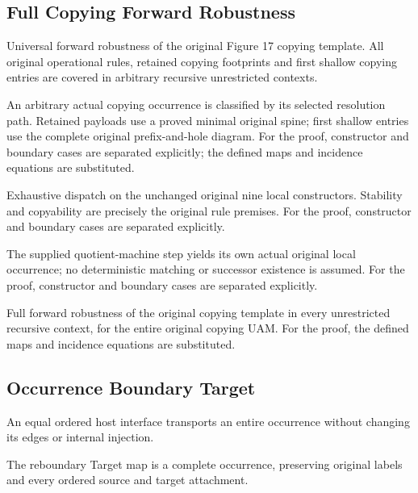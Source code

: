 \subsection{Full Copying Forward Robustness}
Universal forward robustness of the original Figure 17 copying template. All original operational rules, retained copying footprints and first shallow copying entries are covered in arbitrary recursive unrestricted contexts.

An arbitrary actual copying occurrence is classified by its selected resolution path. Retained payloads use a proved minimal original spine; first shallow entries use the complete original prefix-and-hole diagram.
For the proof, constructor and boundary cases are separated explicitly; the defined maps and incidence equations are substituted.
\par{}

Exhaustive dispatch on the unchanged original nine local constructors. Stability and copyability are precisely the original rule premises.
For the proof, constructor and boundary cases are separated explicitly.
\par{}

The supplied quotient-machine step yields its own actual original local occurrence; no deterministic matching or successor existence is assumed.
For the proof, constructor and boundary cases are separated explicitly.
\par{}

Full forward robustness of the original copying template in every unrestricted recursive context, for the entire original copying UAM.
For the proof, the defined maps and incidence equations are substituted.
\par{}

\subsection{Occurrence Boundary Target}
An equal ordered host interface transports an entire occurrence without changing its edges or internal injection.

The reboundary Target map is a complete occurrence, preserving original labels and every ordered source and target attachment.
\par{}

